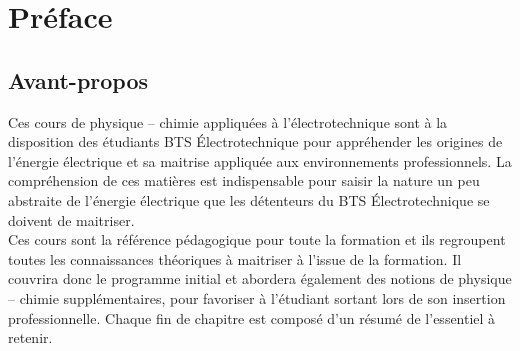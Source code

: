 

\begin{comment}

\documentclass[a4paper, 11pt, twoside]{memoir}

\usepackage{AOCDTF}



	\openleft %

\end{comment}

\chapter{Préface}

\section{Avant-propos}

Ces cours de physique -- chimie appliquées à l'électrotechnique sont à la disposition des étudiants BTS \'Electrotechnique pour appréhender les origines de l'énergie électrique et sa maitrise appliquée aux environnements professionnels. La compréhension de ces matières est indispensable pour saisir la nature un peu abstraite de l'énergie électrique que les détenteurs du BTS \'Electrotechnique se doivent de maitriser.\\
Ces cours sont la référence pédagogique pour toute la formation et ils regroupent toutes les connaissances théoriques à maitriser à l'issue de la formation. Il couvrira donc le programme initial et abordera également des notions de physique -- chimie supplémentaires, pour favoriser à l'étudiant sortant lors de son insertion professionnelle. Chaque fin de chapitre est composé d'un résumé de l'essentiel à retenir.\\

